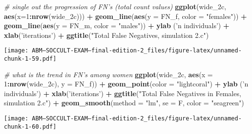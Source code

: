 \documentclass[]{article}
\newenvironment{Shaded}{\begin{snugshade}}{\end{snugshade}}
\newcommand{\KeywordTok}[1]{\textcolor[rgb]{0.13,0.29,0.53}{\textbf{#1}}}
\newcommand{\DataTypeTok}[1]{\textcolor[rgb]{0.13,0.29,0.53}{#1}}
\newcommand{\DecValTok}[1]{\textcolor[rgb]{0.00,0.00,0.81}{#1}}
\newcommand{\StringTok}[1]{\textcolor[rgb]{0.31,0.60,0.02}{#1}}
\newcommand{\CommentTok}[1]{\textcolor[rgb]{0.56,0.35,0.01}{\textit{#1}}}
\newcommand{\OperatorTok}[1]{\textcolor[rgb]{0.81,0.36,0.00}{\textbf{#1}}}
\newcommand{\NormalTok}[1]{#1}
\begin{document}
\begin{Shaded}
\begin{Highlighting}[]
\CommentTok{# single out the progression of FN's (total count values)}
\KeywordTok{ggplot}\NormalTok{(wide_2c, }\KeywordTok{aes}\NormalTok{(}\DataTypeTok{x=}\DecValTok{1}\OperatorTok{:}\KeywordTok{nrow}\NormalTok{(wide_2c))) }\OperatorTok{+}\StringTok{ }
\StringTok{  }\KeywordTok{geom_line}\NormalTok{(}\KeywordTok{aes}\NormalTok{(}\DataTypeTok{y =}\NormalTok{ FN_f, }\DataTypeTok{color =} \StringTok{"females"}\NormalTok{)) }\OperatorTok{+}
\StringTok{  }\KeywordTok{geom_line}\NormalTok{(}\KeywordTok{aes}\NormalTok{(}\DataTypeTok{y =}\NormalTok{ FN_m, }\DataTypeTok{color =} \StringTok{"males"}\NormalTok{)) }\OperatorTok{+}
\StringTok{  }\KeywordTok{ylab}\NormalTok{ (}\StringTok{'n individuals'}\NormalTok{) }\OperatorTok{+}\StringTok{ }\KeywordTok{xlab}\NormalTok{(}\StringTok{'iterations'}\NormalTok{) }\OperatorTok{+}
\StringTok{  }\KeywordTok{ggtitle}\NormalTok{(}\StringTok{"Total False Negatives, simulation 2.c"}\NormalTok{)}
\end{Highlighting}
\end{Shaded}

\texttt{[image: ABM---SOCCULT-EXAM---final-edition-2\_files/figure-latex/unnamed-chunk-1-59.pdf]}

\begin{Shaded}
\begin{Highlighting}[]
\CommentTok{# what is the trend in FN's among women}
\KeywordTok{ggplot}\NormalTok{(wide_2c, }\KeywordTok{aes}\NormalTok{(}\DataTypeTok{x =} \DecValTok{1}\OperatorTok{:}\KeywordTok{nrow}\NormalTok{(wide_2c), }\DataTypeTok{y =}\NormalTok{ FN_f)) }\OperatorTok{+}\StringTok{ }
\StringTok{  }\KeywordTok{geom_point}\NormalTok{(}\DataTypeTok{color =} \StringTok{"lightcoral"}\NormalTok{) }\OperatorTok{+}
\StringTok{  }\KeywordTok{ylab}\NormalTok{ (}\StringTok{'n individuals'}\NormalTok{) }\OperatorTok{+}\StringTok{ }\KeywordTok{xlab}\NormalTok{(}\StringTok{'iterations'}\NormalTok{) }\OperatorTok{+}
\StringTok{  }\KeywordTok{ggtitle}\NormalTok{(}\StringTok{"Total False Negatives in Females, simulation 2.c"}\NormalTok{) }\OperatorTok{+}
\StringTok{  }\KeywordTok{geom_smooth}\NormalTok{(}\DataTypeTok{method =} \StringTok{"lm"}\NormalTok{, }\DataTypeTok{se =}\NormalTok{ F, }\DataTypeTok{color =} \StringTok{"seagreen"}\NormalTok{)}
\end{Highlighting}
\end{Shaded}

\texttt{[image: ABM---SOCCULT-EXAM---final-edition-2\_files/figure-latex/unnamed-chunk-1-60.pdf]}
\end{document}
